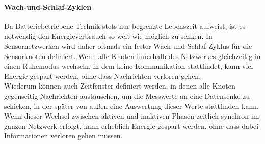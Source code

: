 \paragraph{Wach-und-Schlaf-Zyklen} Da Batteriebetriebene Technik stets nur begrenzte Lebenszeit aufweist, ist es notwendig den Energieverbrauch so weit wie möglich zu senken. In Sensornetzwerken wird daher oftmals ein fester Wach-und-Schlaf-Zyklus für die Sensorknoten definiert. Wenn alle Knoten innerhalb des Netzwerkes gleichzeitig in einen Ruhemodus wechseln, in dem keine Kommunikation stattfindet, kann viel Energie gespart werden, ohne dass Nachrichten verloren gehen. \\
Wiederum können auch Zeitfenster definiert werden, in denen alle Knoten gegenseitig Nachrichten austauschen, um die Messwerte an eine Datensenke zu schicken, in der später von außen eine Auswertung dieser Werte stattfinden kann.\\
Wenn dieser Wechsel zwischen aktiven und inaktiven Phasen zeitlich synchron im ganzen Netzwerk erfolgt, kann erheblich Energie gespart werden, ohne dass dabei Informationen verloren gehen müssen.